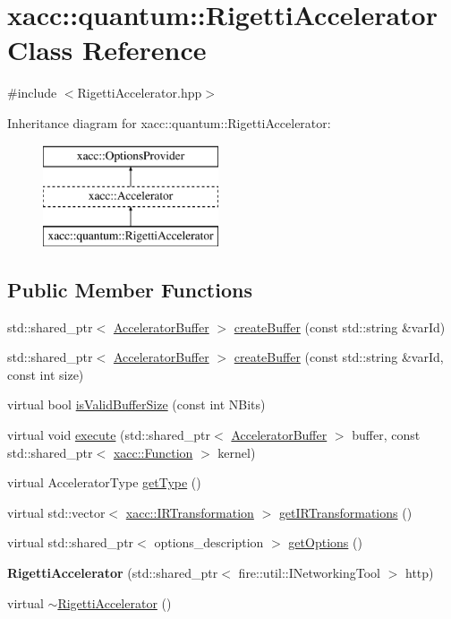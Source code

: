 \hypertarget{a00057}{}\section{xacc\+:\+:quantum\+:\+:Rigetti\+Accelerator Class Reference}
\label{a00057}


{\ttfamily \#include $<$Rigetti\+Accelerator.\+hpp$>$}

Inheritance diagram for xacc\+:\+:quantum\+:\+:Rigetti\+Accelerator\+:\begin{figure}[H]
\begin{center}
\leavevmode
\includegraphics[height=3.000000cm]{a00057}
\end{center}
\end{figure}
\subsection*{Public Member Functions}
\begin{DoxyCompactItemize}
\item 
std\+::shared\+\_\+ptr$<$ \hyperlink{a00013}{Accelerator\+Buffer} $>$ \hyperlink{a00057_ada3ceb986e51ab5aa721f2a08e083cd6}{create\+Buffer} (const std\+::string \&var\+Id)
\item 
std\+::shared\+\_\+ptr$<$ \hyperlink{a00013}{Accelerator\+Buffer} $>$ \hyperlink{a00057_a731551c94b1abef40d2cf032e8712df6}{create\+Buffer} (const std\+::string \&var\+Id, const int size)
\item 
virtual bool \hyperlink{a00057_a61352c07062597aad2393fbeed4cc025}{is\+Valid\+Buffer\+Size} (const int N\+Bits)
\item 
virtual void \hyperlink{a00057_afce7bbd1b0f04300a9920952e9d12ef4}{execute} (std\+::shared\+\_\+ptr$<$ \hyperlink{a00013}{Accelerator\+Buffer} $>$ buffer, const std\+::shared\+\_\+ptr$<$ \hyperlink{a00030}{xacc\+::\+Function} $>$ kernel)
\item 
virtual Accelerator\+Type \hyperlink{a00057_aab0d4674da5273d55407b9ab77cde890}{get\+Type} ()
\item 
virtual std\+::vector$<$ \hyperlink{a00042}{xacc\+::\+I\+R\+Transformation} $>$ \hyperlink{a00057_a443683a1dfb000603c640b2ee303cf66}{get\+I\+R\+Transformations} ()
\item 
virtual std\+::shared\+\_\+ptr$<$ options\+\_\+description $>$ \hyperlink{a00057_a9ee9e62aecbccf193894ca3388676f9f}{get\+Options} ()
\item 
{\bfseries Rigetti\+Accelerator} (std\+::shared\+\_\+ptr$<$ fire\+::util\+::\+I\+Networking\+Tool $>$ http)\hypertarget{a00057_aa92ba39441ec9c261fbddee23a84d6ac}{}\label{a00057_aa92ba39441ec9c261fbddee23a84d6ac}

\item 
virtual \hyperlink{a00057_a7c86895d1c29afa8b7e18476144a3fcf}{$\sim$\+Rigetti\+Accelerator} ()
\end{DoxyCompactItemize}
